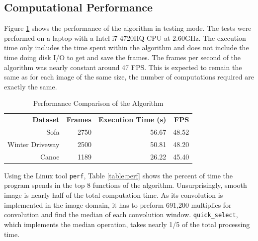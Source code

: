 \documentclass[journal]{IEEEtran}
\begin{document}
\subsection{Computational Performance}

Figure \ref{table:preformance_table} shows the performance of the algorithm in testing mode. The tests were
preformed on a laptop with a Intel i7-4720HQ CPU at 2.60GHz. The execution time
only includes the time spent within the algorithm and does not include the time doing disk I/O to get and
save the frames. The frames per second of the algorithm was nearly constant around 47 FPS. This is expected
to remain the same as for each image of the same size, the number of computations required are exactly the same.

\begin{table}[ht]
\centering
\caption{Performance Comparison of the Algorithm}
\label{table:preformance_table}
\begin{tabular}{llll}
\cline{1-4}
\multicolumn{1}{|r|}{\textbf{Dataset}} & \multicolumn{1}{r|}{\textbf{Frames}} & \multicolumn{1}{r|}{\textbf{Execution Time (s)}} & \multicolumn{1}{r|}{\textbf{FPS}} \\ \cline{1-4}
\multicolumn{1}{|r|}{Sofa}             & \multicolumn{1}{r|}{2750}            & \multicolumn{1}{r|}{56.67}                       & \multicolumn{1}{r|}{48.52}  \\ \cline{1-4}
\multicolumn{1}{|r|}{Winter Driveway}  & \multicolumn{1}{r|}{2500}            & \multicolumn{1}{r|}{50.81}                       & \multicolumn{1}{r|}{48.20}  \\ \cline{1-4}
\multicolumn{1}{|r|}{Canoe}            & \multicolumn{1}{r|}{1189}            & \multicolumn{1}{r|}{26.22}                       & \multicolumn{1}{r|}{45.40}  \\ \cline{1-4}
\end{tabular}
\end{table}
Using the Linux tool \texttt{perf}, Table \ref{table:perf} shows the percent of time the program spends
in the top 8 functions of the algorithm. Unsurprisingly, smooth image is nearly half of the total computation
time. As its convolution is implemented in the image domain, it has to preform 691,200 multiplies for convolution
and find the median of each convolution window. \texttt{quick\_select}, which implements the median operation,
takes nearly 1/5 of the total processing time.
\end{document}
